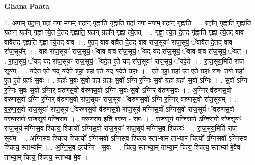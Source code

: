 \documentclass[17pt]{extarticle}
\begin{document}
\textbf{Ghana Paata } \newline

1. अ॒पाम् ग्रहा॒न् ग्रहा॑ न॒पा म॒पाम् ग्रहा᳚न् गृह्णाति गृह्णाति॒ ग्रहा॑ न॒पा म॒पाम् ग्रहा᳚न् गृह्णाति । . ग्रहा᳚न् गृह्णाति गृह्णाति॒ ग्रहा॒न् ग्रहा᳚न् गृह्णा त्ये॒त दे॒तद् गृ॑ह्णाति॒ ग्रहा॒न् ग्रहा᳚न् गृह्णा त्ये॒तत् । . गृ॒ह्णा॒ त्ये॒त दे॒तद् गृ॑ह्णाति गृह्णा त्ये॒तद् वाव वावैतद् गृ॑ह्णाति गृह्णा त्ये॒तद् वाव । . ए॒तद् वाव वावैत दे॒तद् वाव रा॑ज॒सूयꣳ॑ राज॒सूयं॒ ॅवावैत दे॒तद् वाव रा॑ज॒सूय᳚म् । . वाव रा॑ज॒सूयꣳ॑ राज॒सूयं॒ ॅवाव वाव रा॑ज॒सूयं॒ ॅयद् यद् रा॑ज॒सूयं॒ ॅवाव वाव रा॑ज॒सूयं॒ ॅयत् । . रा॒ज॒सूयं॒ ॅयद् यद् रा॑ज॒सूयꣳ॑ राज॒सूयं॒ ॅयदे॒त ए॒ते यद् रा॑ज॒सूयꣳ॑ राज॒सूयं॒ ॅयदे॒ते । . रा॒ज॒सूय॒मिति॑ राज - सूय᳚म् । . यदे॒त ए॒ते यद् यदे॒ते ग्रहा॒ ग्रहा॑ ए॒ते यद् यदे॒ते ग्रहाः᳚ । . ए॒ते ग्रहा॒ ग्रहा॑ ए॒त ए॒ते ग्रहाः᳚ स॒वः स॒वो ग्रहा॑ ए॒त ए॒ते ग्रहाः᳚ स॒वः । . ग्रहाः᳚ स॒वः स॒वो ग्रहा॒ ग्रहाः᳚ स॒वो᳚ ऽग्नि र॒ग्निः स॒वो ग्रहा॒ ग्रहाः᳚ स॒वो᳚ ऽग्निः । . स॒वो᳚ ऽग्नि र॒ग्निः स॒वः स॒वो᳚ ऽग्निर् व॑रुणस॒वो व॑रुणस॒वो᳚ ऽग्निः स॒वः स॒वो᳚ ऽग्निर् व॑रुणस॒वः । . अ॒ग्निर् व॑रुणस॒वो व॑रुणस॒वो᳚ ऽग्नि र॒ग्निर् व॑रुणस॒वो रा॑ज॒सूयꣳ॑ राज॒सूयं॑ ॅवरुणस॒वो᳚ ऽग्नि र॒ग्निर् व॑रुणस॒वो रा॑ज॒सूय᳚म् । . व॒रु॒ण॒स॒वो रा॑ज॒सूयꣳ॑ राज॒सूयं॑ ॅवरुणस॒वो व॑रुणस॒वो रा॑ज॒सूय॑ मग्निस॒वो᳚ ऽग्निस॒वो रा॑ज॒सूयं॑ ॅवरुणस॒वो व॑रुणस॒वो रा॑ज॒सूय॑ मग्निस॒वः । . व॒रु॒ण॒स॒व इति॑ वरुण - स॒वः । . रा॒ज॒सूय॑ मग्निस॒वो᳚ ऽग्निस॒वो रा॑ज॒सूयꣳ॑ राज॒सूय॑ मग्निस॒व श्चित्य॒ श्चित्यो᳚ ऽग्निस॒वो रा॑ज॒सूयꣳ॑ राज॒सूय॑ मग्निस॒व श्चित्यः॑ । . रा॒ज॒सूय॒मिति॑ राज - सूय᳚म् । . अ॒ग्नि॒स॒व श्चित्य॒ श्चित्यो᳚ ऽग्निस॒वो᳚ ऽग्निस॒व श्चित्य॒ स्ताभ्या॒म् ताभ्या॒म् चित्यो᳚ ऽग्निस॒वो᳚ ऽग्निस॒व श्चित्य॒ स्ताभ्या᳚म् । . अ॒ग्नि॒स॒व इत्य॑ग्नि - स॒वः । . चित्य॒ स्ताभ्या॒म् ताभ्या॒म् चित्य॒ श्चित्य॒ स्ताभ्या॑ मे॒वैव ताभ्या॒म् चित्य॒ श्चित्य॒ स्ताभ्या॑ मे॒व । \newline
\end{document}
